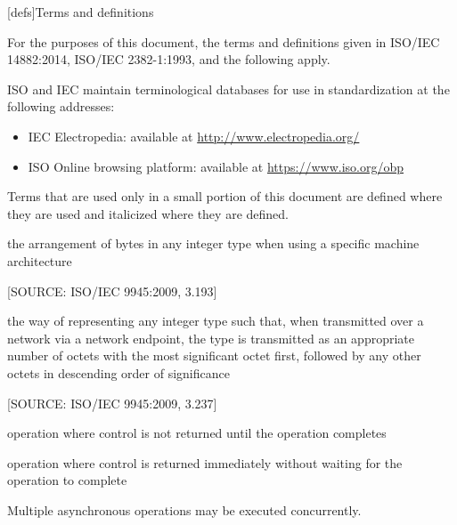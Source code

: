 
[defs]{Terms and definitions}

\pnum
{}%
For the purposes of this document,
the terms and definitions
given in ISO/IEC 14882:2014,
ISO/IEC 2382-1:1993,
and the following apply.

\pnum
ISO and IEC maintain terminological databases
for use in standardization
at the following addresses:
\begin{itemize}
\item IEC Electropedia: available at \url{http://www.electropedia.org/}
\item ISO Online browsing platform: available at \url{https://www.iso.org/obp}
\end{itemize}

\pnum
Terms that are used only in a small portion of this document
are defined where they are used and italicized where they are
defined.

%
the arrangement of bytes in any integer type when using a specific machine architecture

[SOURCE: ISO/IEC 9945:2009, 3.193]

%
the way of representing any integer type such that, when transmitted over a network via a network endpoint,
the  type is transmitted as an appropriate number of octets with the most significant octet first,
followed by any other octets in descending order of significance

[SOURCE: ISO/IEC 9945:2009, 3.237]

%
operation where control is not returned until the operation completes

%
operation where control is returned immediately without waiting for the operation to complete

\begin{defnote}Multiple asynchronous operations may be executed concurrently.\end{defnote}

\setcounter{tocdepth}{1}
